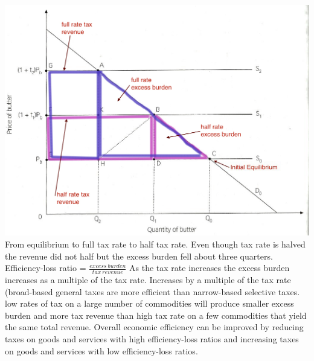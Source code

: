\documentclass[12pt]{examnotes}
\begin{document}
\includegraphics[scale=0.35]{./imgs/114.jpg}
\ra From equilibrium to full tax rate to half tax rate.
\ra Even though tax rate is halved the revenue did not half but the excess burden fell about three quarters.
\ra Efficiency-loss ratio = $\frac{excess\ burden}{tax\ revenue}$ 
\ra As the tax rate increases the excess burden increases as a multiple of the tax rate.
\ra Increases by a multiple of the tax rate (broad-based general taxes are more efficient than narrow-based selective taxes.
\ra low rates of tax on a large number of commodities will produce smaller excess burden and more tax revenue than high tax rate on a few commodities that yield the same total revenue.
\ra Overall economic efficiency can be improved by reducing taxes on goods and services with high efficiency-loss ratios and increasing taxes on goods and services with low efficiency-loss ratios.
\end{document}
